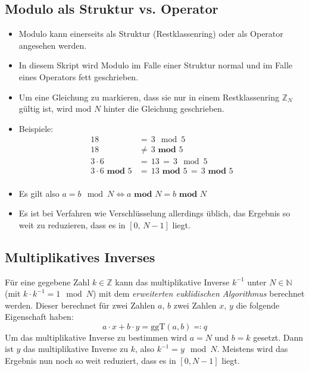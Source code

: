 \documentclass[a4paper, 11pt, accentcolor = tud3b]{tudreport}
\newcommand{\ggT}{\ensuremath{\textrm{ggT}}}
\begin{document}
            \subsection{Modulo als Struktur vs. Operator}
	            \begin{itemize}
	            	\item Modulo kann einerseits als Struktur (Restklassenring) oder als Operator angesehen werden.
	            	\item In diesem Skript wird Modulo im Falle einer Struktur normal und im Falle eines Operators fett geschrieben.
	            	\item Um eine Gleichung zu markieren, dass sie nur in einem Restklassenring \( \mathbb{Z} _ N \) gültig ist, wird \(\text{mod } N \) hinter die Gleichung geschrieben.
	            	\item Beispiele:
		            	\begin{align*}
			            	18 &=\, 3 \mod 5 \tag{Restklassenring} \\
			            	18 &\neq\, 3 \textbf{ mod } 5 \tag{Operator} \\
			            	3 \cdot 6 &=\, 13 \,=\, 3 \mod 5 \tag{Restklassenring} \\
			            	3 \cdot 6 \textbf{ mod } 5 &=\, 13 \textbf{ mod } 5 \,=\, 3 \textbf{ mod } 5 \tag{Operator} \\
		            	\end{align*}
		            \item Es gilt also \( a = b \mod N \iff a \textbf{ mod } N = b \textbf{ mod } N \)
		            \item Es ist bei Verfahren wie Verschlüsselung allerdings üblich, das Ergebnis so weit zu reduzieren, dass es in \( [0,\, N - 1] \) liegt.
	            \end{itemize}
            
            \subsection{Multiplikatives Inverses}
	            Für eine gegebene Zahl \(k \in \mathbb{Z} \) kann das multiplikative Inverse \( k^{-1} \) unter \(N \in \mathbb{N} \) (mit \( k \cdot k^{-1} = 1 \mod N \)) mit dem \textit{erweiterten euklidischen Algorithmus} berechnet werden. Dieser berechnet für zwei Zahlen \(a\), \(b\) zwei Zahlen \( x \), \( y \) die folgende Eigenschaft haben:
	            \begin{equation*}
		            a \cdot x + b \cdot y = \ggT(a, b) \eqqcolon q
	            \end{equation*}
	            Um das multiplikative Inverse zu bestimmen wird \( a = N \) und \( b = k \) gesetzt. Dann ist \(y\) das multiplikative Inverse zu \(k\), also \(k^{-1} = y \mod N \). Meistens wird das Ergebnis nun noch so weit reduziert, dass es in \( [0, N - 1] \) liegt.
	            
\end{document}

